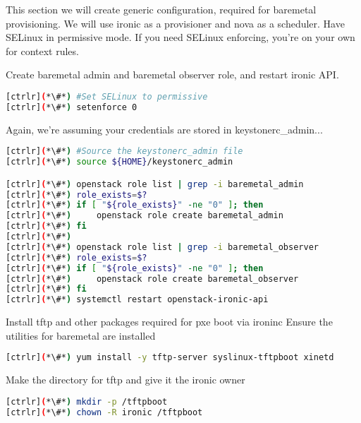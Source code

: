 	This section we will create generic configuration, required for baremetal provisioning. We will use ironic as a provisioner and nova as a scheduler.
	Have SELinux in permissive mode. If you need SELinux enforcing, you're on your own for context rules.

	Create baremetal admin and baremetal observer role, and restart ironic API.



\begin{lstlisting}[language=bash,keywords={}]
[ctrlr](*\#*) #Set SELinux to permissive
[ctrlr](*\#*) setenforce 0
\end{lstlisting}

	Again, we're assuming your credentials are stored in keystonerc\_admin...

\begin{lstlisting}[language=bash,keywords={}]
[ctrlr](*\#*) #Source the keystonerc_admin file
[ctrlr](*\#*) source ${HOME}/keystonerc_admin

[ctrlr](*\#*) openstack role list | grep -i baremetal_admin
[ctrlr](*\#*) role_exists=$?
[ctrlr](*\#*) if [ "${role_exists}" -ne "0" ]; then 
[ctrlr](*\#*)     openstack role create baremetal_admin
[ctrlr](*\#*) fi
[ctrlr](*\#*) 
[ctrlr](*\#*) openstack role list | grep -i baremetal_observer 
[ctrlr](*\#*) role_exists=$?
[ctrlr](*\#*) if [ "${role_exists}" -ne "0" ]; then
[ctrlr](*\#*)     openstack role create baremetal_observer
[ctrlr](*\#*) fi
[ctrlr](*\#*) systemctl restart openstack-ironic-api
\end{lstlisting} 

Install tftp and other packages required for pxe boot via ironinc
Ensure the utilities for baremetal are installed


\begin{lstlisting}[language=bash,keywords={}]
[ctrlr](*\#*) yum install -y tftp-server syslinux-tftpboot xinetd
\end{lstlisting} 

Make the directory for tftp and give it the ironic owner


\begin{lstlisting}[language=bash,keywords={}]
[ctrlr](*\#*) mkdir -p /tftpboot
[ctrlr](*\#*) chown -R ironic /tftpboot
\end{lstlisting} 

